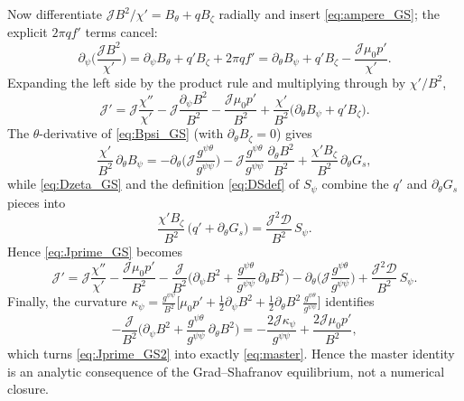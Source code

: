 \documentclass[10pt,a4paper]{article}
\numberwithin{equation}{section}
\begin{document}
Now differentiate $\mathcal JB^2/\chi'=B_\theta+qB_\zeta$ radially and insert
\eqref{eq:ampere_GS}; the explicit $2\pi qf'$ terms cancel:
\begin{equation}
\partial_\psi\!\Big(\frac{\mathcal JB^2}{\chi'}\Big)
=\partial_\psi B_\theta+q'B_\zeta+2\pi qf'
=\partial_\theta B_\psi+q'B_\zeta-\frac{\mathcal J\mu_0p'}{\chi'} .
\end{equation}
Expanding the left side by the product rule and multiplying through by
$\chi'/B^2$,
\begin{equation}
\mathcal J'
=\mathcal J\frac{\chi''}{\chi'}
-\mathcal J\frac{\partial_\psi B^2}{B^2}
-\frac{\mathcal J\mu_0p'}{B^2}
+\frac{\chi'}{B^2}\big(\partial_\theta B_\psi+q'B_\zeta\big) .
\label{eq:Jprime_GS}
\end{equation}
The $\theta$-derivative of \eqref{eq:Bpsi_GS} (with $\partial_\theta B_\zeta=0$)
gives
\begin{equation}
\frac{\chi'}{B^2}\,\partial_\theta B_\psi
=-\partial_\theta\!\Big(\mathcal J\frac{g^{\psi\theta}}{g^{\psi\psi}}\Big)
-\mathcal J\frac{g^{\psi\theta}}{g^{\psi\psi}}\,\frac{\partial_\theta B^2}{B^2}
+\frac{\chi' B_\zeta}{B^2}\,\partial_\theta G_s ,
\end{equation}
while \eqref{eq:Dzeta_GS} and the definition \eqref{eq:DSdef} of $S_\psi$
combine the $q'$ and $\partial_\theta G_s$ pieces into
\begin{equation}
\frac{\chi' B_\zeta}{B^2}\,\big(q'+\partial_\theta G_s\big)
=\frac{\mathcal J^2\mathcal D}{B^2}\,S_\psi .
\end{equation}
Hence \eqref{eq:Jprime_GS} becomes
\begin{equation}
\mathcal J'
=\mathcal J\frac{\chi''}{\chi'}
-\frac{\mathcal J\mu_0p'}{B^2}
-\frac{\mathcal J}{B^2}\Big(\partial_\psi B^2
+\frac{g^{\psi\theta}}{g^{\psi\psi}}\,\partial_\theta B^2\Big)
-\partial_\theta\!\Big(\mathcal J\frac{g^{\psi\theta}}{g^{\psi\psi}}\Big)
+\frac{\mathcal J^2\mathcal D}{B^2}\,S_\psi .
\label{eq:Jprime_GS2}
\end{equation}
Finally, the curvature
$\kappa_\psi=\tfrac{g^{\psi\psi}}{B^2}\big[\mu_0p'
+\tfrac12\partial_\psi B^2+\tfrac12\partial_\theta B^2\,\tfrac{g^{\psi\theta}}{g^{\psi\psi}}\big]$
identifies
\begin{equation}
-\frac{\mathcal J}{B^2}\Big(\partial_\psi B^2
+\frac{g^{\psi\theta}}{g^{\psi\psi}}\,\partial_\theta B^2\Big)
=-\frac{2\mathcal J\kappa_\psi}{g^{\psi\psi}}
+\frac{2\mathcal J\mu_0p'}{B^2},
\end{equation}
which turns \eqref{eq:Jprime_GS2} into exactly \eqref{eq:master}.  Hence the
master identity is an analytic consequence of the Grad--Shafranov
equilibrium, not a numerical closure.
\end{document}
